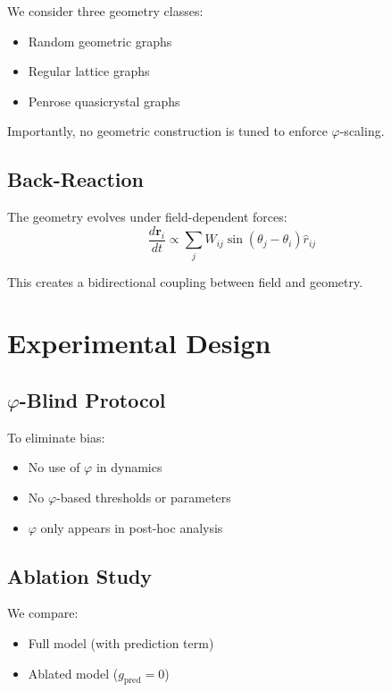 \documentclass[twocolumn]{article}
\begin{document}
We consider three geometry classes:

\begin{itemize}
\item Random geometric graphs
\item Regular lattice graphs
\item Penrose quasicrystal graphs
\end{itemize}

Importantly, no geometric construction is tuned to enforce $\varphi$-scaling.

\subsection{Back-Reaction}

The geometry evolves under field-dependent forces:
\[
\frac{d\mathbf{r}_i}{dt} \propto \sum_j W_{ij} \sin(\theta_j - \theta_i)\hat{r}_{ij}
\]

This creates a bidirectional coupling between field and geometry.

\section{Experimental Design}

\subsection{$\varphi$-Blind Protocol}

To eliminate bias:

\begin{itemize}
\item No use of $\varphi$ in dynamics
\item No $\varphi$-based thresholds or parameters
\item $\varphi$ only appears in post-hoc analysis
\end{itemize}

\subsection{Ablation Study}

We compare:

\begin{itemize}
\item Full model (with prediction term)
\item Ablated model ($g_{\text{pred}} = 0$)
\end{itemize}
\end{document}

